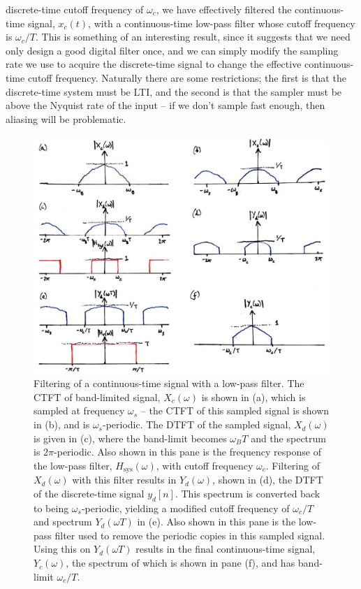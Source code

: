discrete-time cutoff frequency of $\omega_c$, we have
effectively filtered the continuous-time signal, $x_c(t)$, with a
continuous-time low-pass filter whose cutoff frequency is $\omega_c / T$.
This is something of an interesting result, since it suggests that we need
only design a good digital filter once, and we can simply modify the sampling
rate we use to acquire the discrete-time signal to change the effective
continuous-time cutoff frequency. Naturally there are some restrictions;
the first is that the discrete-time system must be LTI, and the second is
that the sampler must be above the Nyquist rate of the input -- if we don't
sample fast enough, then aliasing will be problematic.
%
\begin{figure}[H]
  \includegraphics[width=\textwidth]{images/lecture_14_filtering_continuous.JPG}
  \caption{Filtering of a continuous-time signal with a low-pass filter.
    The CTFT of band-limited signal, $X_c(\omega)$ is shown in (a), which
    is sampled at frequency $\omega_s$ -- the CTFT of this sampled signal is
    shown in (b), and is $\omega_s$-periodic. The DTFT of the sampled signal,
    $X_d(\omega)$ is given in (c), where the band-limit becomes $\omega_B T$ and
    the spectrum is $2\pi$-periodic. Also shown in this pane is the frequency
    response of the low-pass filter, $H_\mathrm{sys}(\omega)$, with cutoff frequency
    $\omega_c$. Filtering of $X_d(\omega)$ with this filter results in $Y_d(\omega)$,
    shown in (d), the DTFT of the discrete-time signal $y_d[n]$. This spectrum is
    converted back to being $\omega_s$-periodic, yielding a modified cutoff frequency
    of $\omega_c/T$ and spectrum $Y_d(\omega T)$ in (e). Also shown in this pane is
    the low-pass filter used to remove the periodic copies in this sampled signal.
    Using this on $Y_d(\omega T)$ results in the final continuous-time signal,
    $Y_c(\omega)$, the spectrum of which is shown in pane (f), and has band-limit
    $\omega_c / T$.
  }
  \label{fig::lecture_14_filtering_continuous}
\end{figure}
